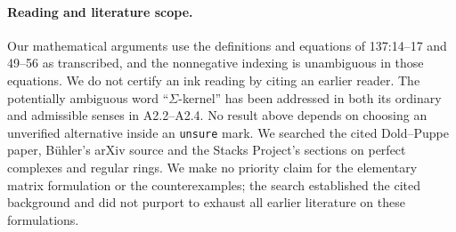 \paragraph{Reading and literature scope.}
Our mathematical arguments use the definitions and equations of
137:14--17 and 49--56 as transcribed, and the nonnegative indexing
is unambiguous in those equations.  We do not certify an ink
reading by citing an earlier reader.  The potentially ambiguous
word ``$\Sigma$-kernel'' has been addressed in both its ordinary
and admissible senses in A2.2--A2.4.  No result above depends on
choosing an unverified alternative inside an \texttt{unsure}
mark.  We searched the cited Dold--Puppe paper, B\"uhler's
arXiv source and the Stacks Project's sections on perfect
complexes and regular rings.  We make no priority claim for the
elementary matrix formulation or the counterexamples; the
search established the cited background and did not purport to
exhaust all earlier literature on these formulations.
